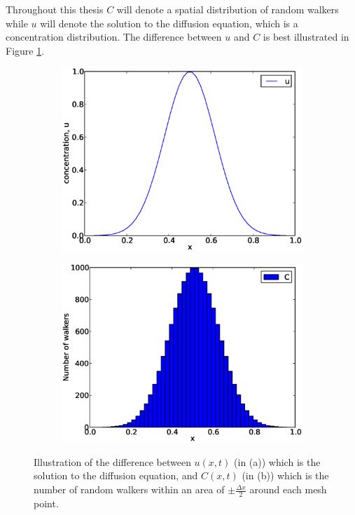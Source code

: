\noindent Throughout this thesis $C$ will denote a spatial distribution of random walkers while $u$ will denote the solution to the diffusion equation, which is a concentration distribution. 
The difference between $u$ and $C$ is best illustrated in Figure \ref{theory:illustration_C}.

\begin{figure}[H]
 \centering
 \begin{subfigure}{0.48\textwidth}
  \includegraphics[width=\textwidth]{Figures/illustration_C_pt1.eps}
  \caption{}
 \end{subfigure}
 \begin{subfigure}{0.48\textwidth}
  \includegraphics[width=\textwidth]{Figures/illustration_C_pt2.eps}
  \caption{}
 \end{subfigure}
 \caption[Illustration of $C(x)$]{Illustration of the difference between $u(x,t)$ (in (a)) which is the solution to the diffusion equation, and $C(x,t)$ (in (b)) which is the number of random walkers within an area of $\pm\frac{\Delta x}{2}$ around each mesh point.}
 \label{theory:illustration_C}
\end{figure}

